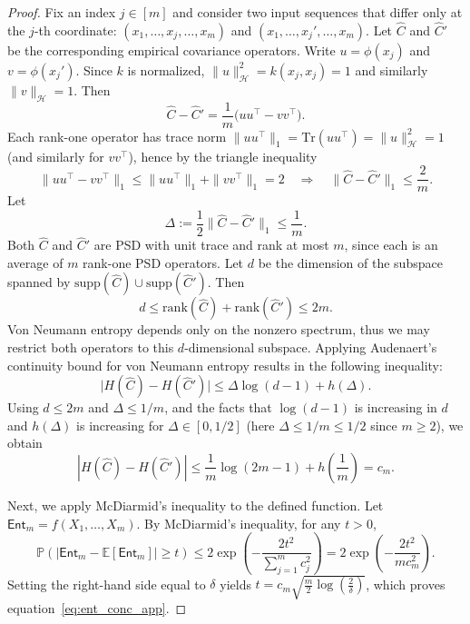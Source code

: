 \documentclass{article}
\theoremstyle{plain}
\theoremstyle{definition}
\def\eqref#1{equation~\ref{#1}}
\renewcommand{\cite}{\citep}
\begin{document}
\begin{appendices}
\begin{proof}
Fix an index $j\in[m]$ and consider two input sequences that differ only at the $j$-th coordinate:
$(x_1,\ldots,x_j,\ldots,x_m)$ and $(x_1,\ldots,x_j',\ldots,x_m)$.
Let $\widehat{C}$ and $\widehat{C}'$ be the corresponding empirical covariance operators.
Write $u=\phi(x_j)$ and $v=\phi(x_j')$.
Since $k$ is normalized, $\|u\|_{\mathcal{H}}^2=k(x_j,x_j)=1$ and similarly $\|v\|_{\mathcal{H}}=1$.
Then
\[
\widehat{C}-\widehat{C}'
=
\frac{1}{m}\big(uu^\top - vv^\top\big).
\]
Each rank-one operator has trace norm
$\|uu^\top\|_1=\mathrm{Tr}(uu^\top)=\|u\|_{\mathcal{H}}^2=1$ (and similarly for $vv^\top$),
hence by the triangle inequality
\[
\|uu^\top - vv^\top\|_1 \le \|uu^\top\|_1+\|vv^\top\|_1 = 2
\quad\Longrightarrow\quad
\|\widehat{C}-\widehat{C}'\|_1 \le \frac{2}{m}.
\]
Let
\[
\Delta := \frac{1}{2}\|\widehat{C}-\widehat{C}'\|_1 \le \frac{1}{m}.
\]
Both $\widehat{C}$ and $\widehat{C}'$ are PSD with unit trace and rank at most $m$,
since each is an average of $m$ rank-one PSD operators.
Let $d$ be the dimension of the subspace spanned by $\mathrm{supp}(\widehat{C})\cup \mathrm{supp}(\widehat{C}')$.
Then
\[
d \le \mathrm{rank}(\widehat{C})+\mathrm{rank}(\widehat{C}') \le 2m.
\]
Von Neumann entropy depends only on the nonzero spectrum, thus we may restrict both operators to this $d$-dimensional subspace.
Applying Audenaert's continuity bound for von Neumann entropy \cite{audenaert2007sharp} results in the following inequality:
\begin{equation}\label{eq:audenaert_bound_app}
\bigl\vert H(\widehat{C})-H(\widehat{C}')\bigr\vert
\le
\Delta\log(d-1) + h(\Delta).
\end{equation}
Using $d\le 2m$ and $\Delta\le 1/m$, and the facts that $\log(d-1)$ is increasing in $d$ and
$h(\Delta)$ is increasing for $\Delta\in[0,1/2]$ (here $\Delta\le 1/m\le 1/2$ since $m\ge 2$), we obtain
\[
|H(\widehat{C})-H(\widehat{C}')|
\le
\frac{1}{m}\log(2m-1) + h\left(\frac{1}{m}\right)
=
c_m.
\]

Next, we apply McDiarmid's inequality to the defined function. 
Let $\mathsf{Ent}_m = f(X_1,\ldots,X_m)$.
By McDiarmid's inequality, for any $t>0$,
\[
\mathbb{P}\left(\big|\mathsf{Ent}_m-\mathbb{E}[\mathsf{Ent}_m]\big|\ge t\right)
\le
2\exp\left(-\frac{2t^2}{\sum_{j=1}^m c_j^2}\right)
=
2\exp\left(-\frac{2t^2}{m c_m^2}\right).
\]
Setting the right-hand side equal to $\delta$ yields
$t = c_m\sqrt{\frac{m}{2}\log\left(\frac{2}{\delta}\right)}$,
which proves \eqref{eq:ent_conc_app}.


\end{proof}
\end{appendices}
\end{document}
